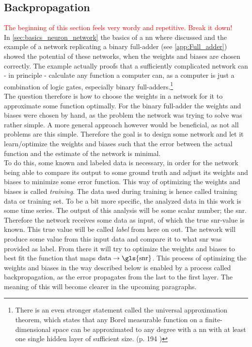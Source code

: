 \subsection{Backpropagation}\label{sec:backpropagation}
\textcolor{red}{The beginning of this section feels very wordy and repetitive. Break it down!}\\
In \autoref{sec:basics_neuron_network} the basics of a \gls{nn} where discussed and the example of a network replicating a binary full-adder (see \autoref{app:Full_adder}) showed the potential of these networks, when the weights and biases are chosen correctly. The example actually proofs that a sufficiently complicated network can - in principle - calculate any function a computer can, as a computer is just a combination of logic gates, especially binary full-adders.\footnote{There is an even stronger statement called the universal approximation theorem, which states that any Borel measurable function on a finite-dimensional space can be approximated to any degree with a \gls{nn} with at least one single hidden layer of sufficient size. (p. 194 \cite{deep_learning_book})}\cite{deep_learning_beginning}\\
The question therefore is how to choose the weights in a network for it to approximate some function optimally. For the binary full-adder the weights and biases were chosen by hand, as the problem the network was trying to solve was rather simple. A more general approach however would be beneficial, as not all problems are this simple. Therefore the goal is to design some network and let it learn/optimize the weights and biases such that the error between the actual function and the estimate of the network is minimal.\\
To do this, some known and labeled data is necessary, in order for the network being able to compare its output to some ground truth and adjust its weights and biases to minimize some error function. This way of optimizing the weights and biases is called \emph{training}. The data used during training is hence called training data or training set. To be a bit more specific, the analyzed data in this work is some time series. The output of this analysis will be some scalar number; the \gls{snr}. Therefore the network receives some data as input, of which the true \gls{snr}-value is known. This true value will be called \emph{label} from here on out. The network will produce some value from this input data and compare it to what \gls{snr} was provided as label. From there it will try to optimize the weights and biases to best fit the function that maps $\text{data}\to\text{\gls{snr}}$. This process of optimizing the weights and biases in the way described below is enabled by a process called backpropagation, as the error propagates from the last to the first layer. The meaning of this will become clearer in the upcoming paragraphs.\\
